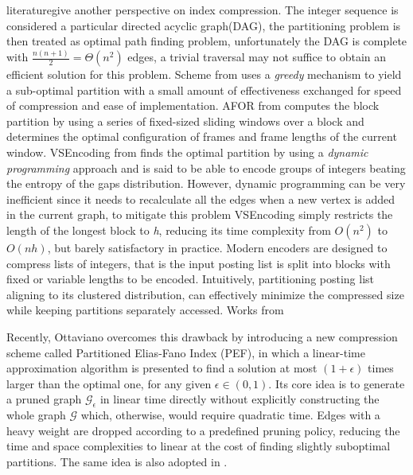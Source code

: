 \documentclass[runningheads,a4paper]{llncs}
\begin{document}
literature\cite{anh2004index,delbru2010adaptive,silvestri2010vsencoding}give another perspective on index compression. The integer sequence is considered a particular directed acyclic graph(DAG), the partitioning problem is then treated as optimal path finding problem, unfortunately the DAG is complete with $ \frac{n\left( n+1\right)}{2} = \Theta\left( n^{2}\right) $ edges, a trivial traversal may not suffice to obtain an efficient solution for this problem. Scheme from \cite{anh2004index} uses a \textit{greedy} mechanism to yield a sub-optimal partition with a small amount of effectiveness exchanged for speed of compression and ease of implementation. AFOR from \cite{delbru2010adaptive} computes the block partition by using a series of fixed-sized sliding windows over a block and determines the optimal configuration of frames and frame lengths of the current window. VSEncoding from \cite{silvestri2010vsencoding} finds the optimal partition by using a \textit{dynamic programming} approach and is said to be able to encode groups of integers beating the entropy of the gaps distribution. However, dynamic programming can be very inefficient since it needs to recalculate all the edges when a new vertex is added in the current graph, to mitigate this problem VSEncoding simply restricts the length of the longest block to \textit{h}, reducing its time complexity from $O(n^{2})$ to $O(nh)$, but barely satisfactory in practice.
Modern encoders are designed to compress lists of integers, that is the input posting list is split into blocks with fixed or variable lengths to be encoded. Intuitively, partitioning posting list aligning to its clustered distribution, can effectively minimize the compressed size while keeping partitions separately accessed. Works from 

Recently, Ottaviano overcomes this drawback by introducing a new compression scheme called Partitioned Elias-Fano Index (PEF)\cite{ottaviano2014partitioned}, in which a linear-time approximation algorithm is presented to find a solution at most $\left(1+\epsilon\right)$ times larger than the optimal one, for any given $\epsilon\in\left(0,1\right)$. Its core idea is to generate a pruned graph $\mathcal{G}_{\epsilon}$ in linear time directly without explicitly constructing the whole graph $\mathcal{G}$ which, otherwise, would require quadratic time. Edges with a heavy weight are dropped according to a predefined pruning policy, reducing the time and space complexities to linear at the cost of finding slightly suboptimal partitions. The same idea is also adopted in \cite{ferragina2011optimally}.
\end{document}
